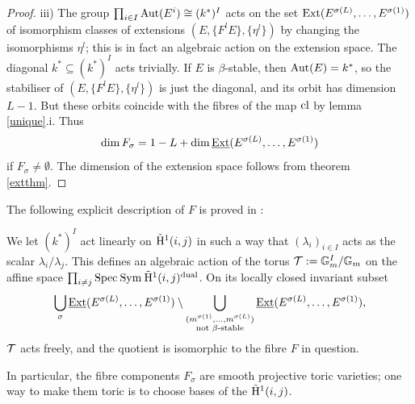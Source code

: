 \documentclass{article}
\begin{document}
\begin{proof}
  iii) The group $\prod_{i \in I} \mathrm{Aut}(E^i) \cong (k^*)^I$ acts on the set $\mathrm{Ext}( E^{\sigma(L)}, \ldots, E^{\sigma(1)})$ of isomorphism classes of
  extensions $(E, \{F^l E\}, \{\eta^l\})$ by changing the isomorphisms $\eta^l$; this is in fact an algebraic action on the extension space. The diagonal
  $k^* \subseteq (k^*)^I$ acts trivially. If $E$ is $\beta$-stable, then $\mathrm{Aut}(E) = k^*$, so the stabiliser of $(E, \{F^l E\}, \{\eta^l\})$ is just the
  diagonal, and its orbit has dimension $L-1$. But these orbits coincide with the fibres of the map $\mathrm{cl}$ by lemma \ref{unique}.i. Thus
  \begin{displaymath}
    \dim F_{\sigma} = 1 - L + \dim \underline{\mathrm{Ext}}( E^{\sigma(L)}, \ldots, E^{\sigma(1)})
  \end{displaymath}
  if $F_{\sigma} \neq \emptyset$. The dimension of the extension space follows from theorem \ref{extthm}.
\end{proof}

\begin{rem}
  The following explicit description of $F$ is proved in \cite{diss}:

  We let $(k^*)^I$ act linearly on $\tilde{\mathrm{H}}^1(i, j)$ in such a way that $(\lambda_i)_{i \in I}$ acts as the scalar $\lambda_i/\lambda_j$. This
  defines an algebraic action of the torus $\mathcal{T} := \mathbb{G}_m^I/\mathbb{G}_m$ on the affine space $\prod_{i \neq j} \mathrm{Spec}\: \mathrm{Sym}\: \tilde{\mathrm{H}}^1(i, j)^{\mathrm{dual}}$. On its
  locally closed invariant subset
  \begin{displaymath}
    \bigcup_{\sigma} \underline{\mathrm{Ext}}(E^{\sigma(L)}, \ldots, E^{\sigma(1)})
    \setminus \bigcup_{\substack{(m^{\sigma(1)}, \ldots, m^{\sigma(L)})\\ \text{not $\beta$-stable}}}
                     \underline{\mathrm{Ext}}(E^{\sigma(L)}, \ldots, E^{\sigma(1)}),
  \end{displaymath}
  $\mathcal{T}$ acts freely, and the quotient is isomorphic to the fibre $F$ in question.

  In particular, the fibre components $F_{\sigma}$ are smooth projective toric varieties; one way to make them toric is to choose bases of the
  $\tilde{\mathrm{H}}^1(i,j)$.
\end{rem}
\end{document}
